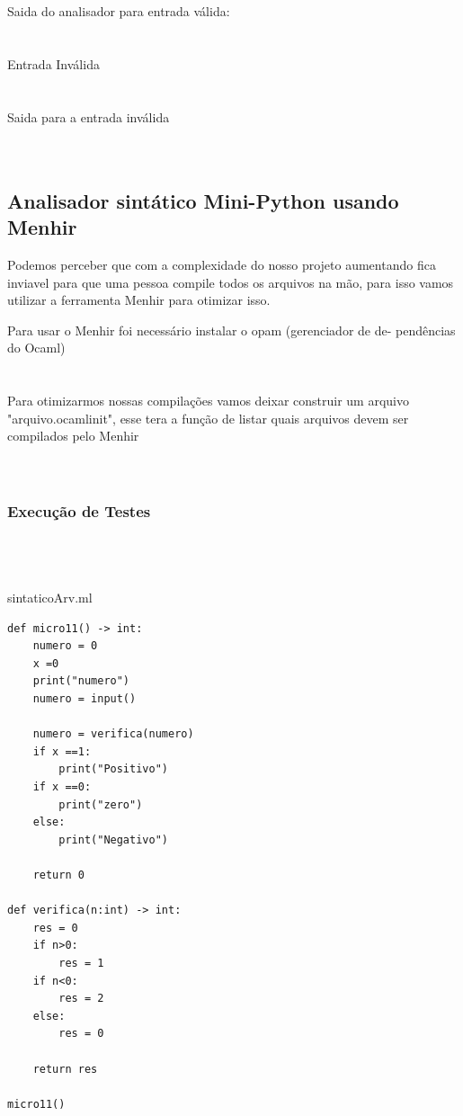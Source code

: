 \documentclass{article}
\begin{document}
Saida do analisador para entrada válida:\\
\\\\

Entrada Inválida\\
\\\\

Saida para a entrada inválida\\
\\\\



\subsection{Analisador sintático Mini-Python usando Menhir}
Podemos perceber que com a complexidade do nosso projeto aumentando fica inviavel para que uma pessoa compile todos os arquivos na mão, para isso vamos utilizar a ferramenta Menhir para otimizar isso.

Para usar o Menhir foi necessário instalar o opam (gerenciador de de-
pendências do Ocaml)\\
\\
\
\\

Para otimizarmos nossas compilações vamos deixar construir um arquivo "arquivo.ocamlinit", esse tera a função de listar quais arquivos devem ser compilados pelo Menhir\\
\\
\
\\

\subsubsection{Execução de Testes}



\\\\\\sintaticoArv.ml
\begin{lstlisting}
def micro11() -> int:
    numero = 0
    x =0
    print("numero")
    numero = input()
    
    numero = verifica(numero)
    if x ==1:
        print("Positivo")
    if x ==0:
        print("zero")
    else:
        print("Negativo")
    
    return 0
    
def verifica(n:int) -> int:
    res = 0
    if n>0:
        res = 1
    if n<0:
        res = 2
    else:
        res = 0
    
    return res
    
micro11()
\end{lstlisting}
\end{document}
